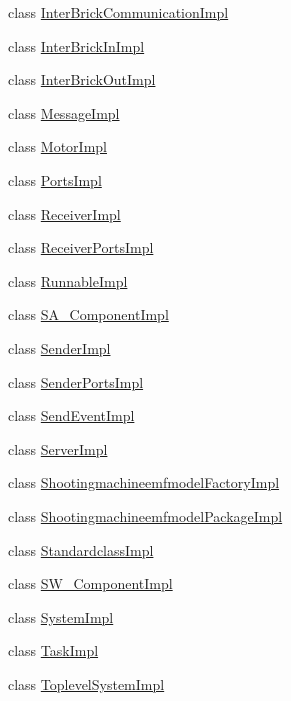 \begin{DoxyCompactItemize}
class \hyperlink{classshootingmachineemfmodel_1_1impl_1_1_inter_brick_communication_impl}{Inter\-Brick\-Communication\-Impl}
\item 
class \hyperlink{classshootingmachineemfmodel_1_1impl_1_1_inter_brick_in_impl}{Inter\-Brick\-In\-Impl}
\item 
class \hyperlink{classshootingmachineemfmodel_1_1impl_1_1_inter_brick_out_impl}{Inter\-Brick\-Out\-Impl}
\item 
class \hyperlink{classshootingmachineemfmodel_1_1impl_1_1_message_impl}{Message\-Impl}
\item 
class \hyperlink{classshootingmachineemfmodel_1_1impl_1_1_motor_impl}{Motor\-Impl}
\item 
class \hyperlink{classshootingmachineemfmodel_1_1impl_1_1_ports_impl}{Ports\-Impl}
\item 
class \hyperlink{classshootingmachineemfmodel_1_1impl_1_1_receiver_impl}{Receiver\-Impl}
\item 
class \hyperlink{classshootingmachineemfmodel_1_1impl_1_1_receiver_ports_impl}{Receiver\-Ports\-Impl}
\item 
class \hyperlink{classshootingmachineemfmodel_1_1impl_1_1_runnable_impl}{Runnable\-Impl}
\item 
class \hyperlink{classshootingmachineemfmodel_1_1impl_1_1_s_a___component_impl}{S\-A\-\_\-\-Component\-Impl}
\item 
class \hyperlink{classshootingmachineemfmodel_1_1impl_1_1_sender_impl}{Sender\-Impl}
\item 
class \hyperlink{classshootingmachineemfmodel_1_1impl_1_1_sender_ports_impl}{Sender\-Ports\-Impl}
\item 
class \hyperlink{classshootingmachineemfmodel_1_1impl_1_1_send_event_impl}{Send\-Event\-Impl}
\item 
class \hyperlink{classshootingmachineemfmodel_1_1impl_1_1_server_impl}{Server\-Impl}
\item 
class \hyperlink{classshootingmachineemfmodel_1_1impl_1_1_shootingmachineemfmodel_factory_impl}{Shootingmachineemfmodel\-Factory\-Impl}
\item 
class \hyperlink{classshootingmachineemfmodel_1_1impl_1_1_shootingmachineemfmodel_package_impl}{Shootingmachineemfmodel\-Package\-Impl}
\item 
class \hyperlink{classshootingmachineemfmodel_1_1impl_1_1_standardclass_impl}{Standardclass\-Impl}
\item 
class \hyperlink{classshootingmachineemfmodel_1_1impl_1_1_s_w___component_impl}{S\-W\-\_\-\-Component\-Impl}
\item 
class \hyperlink{classshootingmachineemfmodel_1_1impl_1_1_system_impl}{System\-Impl}
\item 
class \hyperlink{classshootingmachineemfmodel_1_1impl_1_1_task_impl}{Task\-Impl}
\item 
class \hyperlink{classshootingmachineemfmodel_1_1impl_1_1_toplevel_system_impl}{Toplevel\-System\-Impl}
\end{DoxyCompactItemize}
